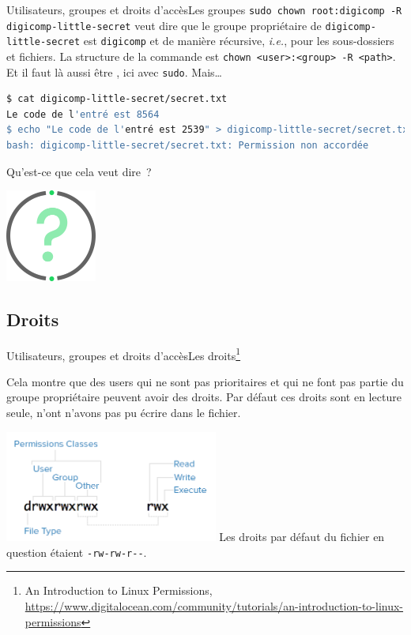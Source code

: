 \documentclass{beamer}
\begin{document}
    \begin{frame}[fragile]{Utilisateurs, groupes et droits d'accès}{Les groupes}
        \lstinline{sudo chown root:digicomp -R digicomp-little-secret} veut dire que le groupe propriétaire de \lstinline{digicomp-little-secret} est \lstinline{digicomp} et de manière récursive, \textit{i.e.}, pour les sous-dossiers et fichiers.
        La structure de la commande est \lstinline{chown <user>:<group> -R <path>}.
        Et il faut là aussi être , ici avec \lstinline{sudo}.
        \bigbreak
        Mais\ldots
        \begin{lstlisting}[language=bash]
$ cat digicomp-little-secret/secret.txt
Le code de l'entré est 8564
$ echo "Le code de l'entré est 2539" > digicomp-little-secret/secret.txt
bash: digicomp-little-secret/secret.txt: Permission non accordée
        \end{lstlisting}
        Qu'est-ce que cela veut dire~?
        \begin{center}
            \includegraphics[width=3cm]{image/question-mark}
        \end{center}
    \end{frame}

    \subsection{Droits}\label{subsec:droits}

    \begin{frame}{Utilisateurs, groupes et droits d'accès}{Les droits\footnote{\label{rights-digitalocean}An Introduction to Linux Permissions, \url{https://www.digitalocean.com/community/tutorials/an-introduction-to-linux-permissions}}}
        \begin{dangercolorbox}
            Cela montre que des users qui ne sont pas prioritaires et qui ne font pas partie du groupe propriétaire peuvent avoir des droits.
            Par défaut ces droits sont en lecture seule, n'ont n'avons pas pu écrire dans le fichier.
        \end{dangercolorbox}
        \centering
        \includegraphics[width=7cm]{image/permission-classes}
        \flushleft
        Les droits par défaut du fichier en question étaient \lstinline{-rw-rw-r--}.
    \end{frame}
\end{document}
